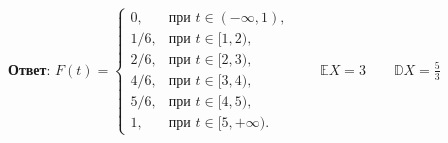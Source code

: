 \documentclass{article}
\begin{document}
\begin{enumerate}
\textbf{Ответ}:
$F(t) = \begin{cases}
    0, &\text{при } t \in (-\infty, 1),\\
    1/6, &\text{при } t \in [1, 2),\\
    2/6, &\text{при } t \in [2, 3),\\
    4/6, &\text{при } t \in [3, 4),\\
    5/6, &\text{при } t \in [4, 5),\\
    1, &\text{при } t \in [5, +\infty).
\end{cases} \qquad \mathbb{E}X = 3 \qquad \mathbb{D}X = \frac{5}{3}$



\end{enumerate}
\end{document}
